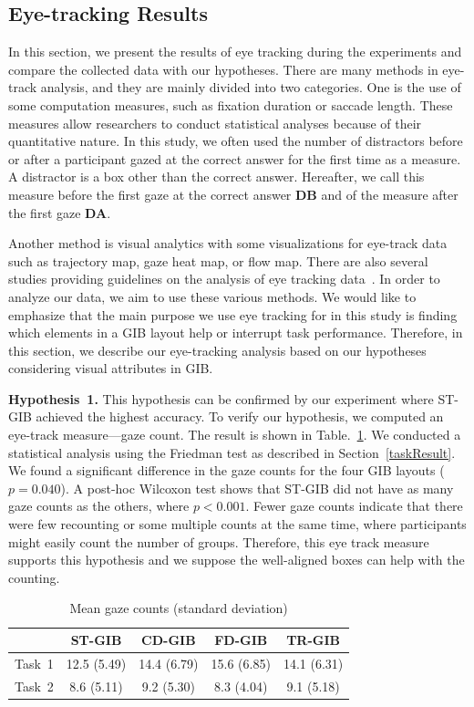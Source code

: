 \documentclass[review]{vgtc}                 %
\begin{document}
\subsection{Eye-tracking Results}
\label{eyetrack}
In this section, we present the results of eye tracking during the experiments and compare the collected data with our hypotheses.
There are many methods in eye-track analysis, and they are mainly divided into two categories. One is the use of some computation measures, such as fixation duration or saccade length.
These measures allow researchers to conduct statistical analyses because of their quantitative nature.
In this study, we often used the number of distractors before or after a participant gazed at the correct answer for the first time as a measure.
A distractor is a box other than the correct answer.
Hereafter, we call this measure before the first gaze at the correct answer {\bf DB} and of the measure after the first gaze {\bf DA}.

Another method is visual analytics with some visualizations for eye-track data such as trajectory map, gaze heat map, or flow map.
There are also several studies providing guidelines on the analysis of eye tracking data~\cite{andrienko2012visual,duchowski2007eye,kurzhals2014evaluating}. In order to analyze our data, we aim to use these various methods. We would like to emphasize that the main purpose we use eye tracking for in this study is finding which elements in a GIB layout help or interrupt task performance. Therefore, in this section, we describe our eye-tracking analysis based on our hypotheses considering visual attributes in GIB.

{\bf Hypothesis~1.} This hypothesis can be confirmed by our experiment where ST-GIB achieved the highest accuracy.
To verify our hypothesis, we computed an eye-track measure---gaze count.
The result is shown in Table.~\ref{gazecount}.
We conducted a statistical analysis using the Friedman test as described in Section~\ref{taskResult}.
We found a significant difference in the gaze counts for the four GIB layouts ($p=0.040$). A post-hoc Wilcoxon test shows that ST-GIB did not have as many gaze counts as the others, where $p<0.001$. Fewer gaze counts indicate that there were few recounting or some multiple counts at the same time, where participants might easily count the number of groups. Therefore, this eye track measure supports this hypothesis and we suppose the well-aligned boxes can help with the counting.

\begin{table}[b]
  \begin{center}
    \caption{Mean gaze counts (standard deviation)}
    \label{gazecount}
    \begin{tabular}{|c|c|c|c|c|} \hline
      & ST-GIB & CD-GIB & FD-GIB & TR-GIB \\ \hline
      Task~1 & 12.5 (5.49) & 14.4 (6.79) & 15.6 (6.85) & 14.1 (6.31) \\ \hline
      Task~2 & 8.6 (5.11) & 9.2 (5.30) & 8.3 (4.04) & 9.1 (5.18) \\ \hline
    \end{tabular}
    \end{center}
\end{table}
\end{document}
